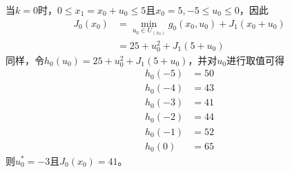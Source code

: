\documentclass{article}
\begin{document}
\begin{enumerate}[(a)]
            当$k=0$时，$0\leq x_1=x_0+u_0\leq 5$且$x_0=5,-5\leq u_0\leq 0$，因此
            \begin{equation}
                \begin{split}
                    J_0(x_0) &=\min_{u_0\in U_{(x_0)}}g_0(x_0,u_0)+J_1(x_0+u_0)\\
                    &=25+u_0^2+J_1(5+u_0)
                \end{split}
            \end{equation}
            同样，令$h_0(u_0)=25+u_0^2+J_1(5+u_0)$，并对$u_0$进行取值可得
            \begin{equation}
                \begin{aligned}
                    h_0(-5)&=50\\
                    h_0(-4)&=43\\
                    h_0(-3)&=41\\
                    h_0(-2)&=44\\
                    h_0(-1)&=52\\
                    h_0(0)&=65
                \end{aligned}
            \end{equation}
            则$u^*_0=-3$且$J_0(x_0)=41$。
    \end{enumerate}
\end{document}
